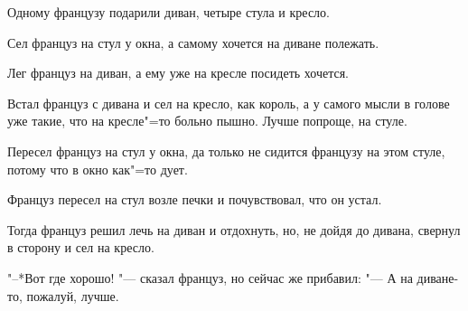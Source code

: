 
Одному  французу подарили диван,  четыре
стула и кресло.
    
Сел француз на стул у окна, а самому хочется на диване полежать.
    
Лег француз на диван, а ему уже на кресле посидеть хочется.
    
Встал француз с  дивана и сел на кресло,
как король, а у самого  мысли  в голове  уже
такие, что на кресле"=то больно пышно.  Лучше
попроще, на стуле.
    
Пересел француз на стул у окна, да только не сидится французу на этом стуле, потому
что в окно как"=то дует.
    
Француз  пересел  на стул возле печки  и
почувствовал, что он устал.
    
Тогда  француз решил лечь на диван и отдохнуть,  но, не дойдя до дивана,  свернул в
сторону и сел на кресло.
     
"--*Вот где хорошо!  "--- сказал француз, но
сейчас же прибавил:  "--- А на диване-то, пожалуй, лучше.
